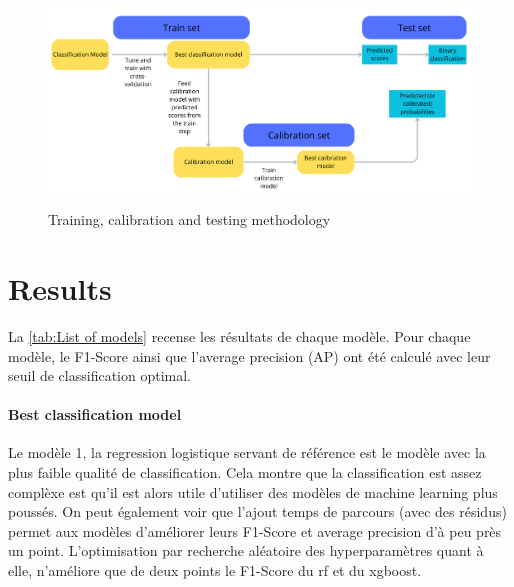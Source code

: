 \documentclass[12pt]{article}
\begin{document}
\begin{figure}[h]
    \centering
    \includegraphics[width=1\textwidth]{Methodology.png}\\
    \caption{Training, calibration and testing methodology}
    \label{fig:Methodogoly}
\end{figure}
\FloatBarrier



\newpage
\section{Results}

La \autoref{tab:List of models} recense les résultats de chaque modèle. Pour chaque modèle, le F1-Score ainsi que l'average precision (AP) ont été calculé avec leur seuil de classification optimal. 

\paragraph{Best classification model}
Le modèle 1, la regression logistique servant de référence est le modèle avec la plus faible qualité de classification. Cela montre que la classification est assez complèxe est qu'il est alors utile d'utiliser des modèles de machine learning plus poussés. On peut également voir que l'ajout temps de parcours (avec des résidus) permet aux modèles d'améliorer leurs F1-Score et average precision d'à peu près un point.
L'optimisation par recherche aléatoire des hyperparamètres quant à elle, n'améliore que de deux points le F1-Score du \acrshort{rf} et du \acrshort{xgboost}.\hfill \break
\end{document}
